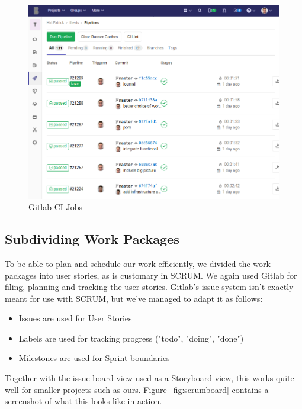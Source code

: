 \begin{figure}
    \begin{center}
        \includegraphics[width=0.8\linewidth]{images/gitlabcijobs.png}
        \caption{Gitlab CI Jobs}
        \label{fig:gitlabcijobs}
    \end{center}
\end{figure}

\subsection{Subdividing Work Packages}\label{subsec:subdividing-work-packages}
To be able to plan and schedule our work efficiently,
we divided the work packages into user stories,
as is customary in SCRUM.
We again used Gitlab for filing, planning and tracking the user stories.
Gitlab's issue system isn't exactly meant for use with SCRUM,
but we've managed to adapt it as follows:
\begin{itemize}
    \item Issues are used for User Stories
    \item Labels are used for tracking progress ("todo", "doing", "done")
    \item Milestones are used for Sprint boundaries
\end{itemize}
Together with the issue board view used as a Storyboard view,
this works quite well for smaller projects such as ours.
Figure~\ref{fig:scrumboard} contains a screenshot of what this looks like in action.

